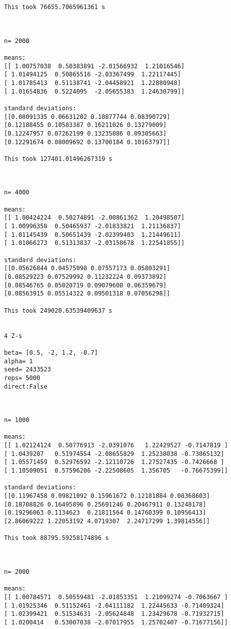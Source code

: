 \documentclass{article}
\theoremstyle{definition}
\theoremstyle{remark}
\begin{document}
\begin{verbatim}
This took 76655.7065961361 s



n= 2000

means: 
[[ 1.00757038  0.50383891 -2.01566932  1.21016546]
[ 1.01494125  0.50865516 -2.03367499  1.22117445]
[ 1.01785413  0.51138741 -2.04458921  1.22880948]
[ 1.01654836  0.5224095  -2.05655383  1.24630799]]

standard deviations: 
[[0.08091335 0.06631202 0.10877744 0.08390729]
[0.12188455 0.10583387 0.16211026 0.13279009]
[0.12247957 0.07262199 0.13235086 0.09305663]
[0.12291674 0.08009692 0.13700184 0.10163797]]

This took 127401.01496267319 s



n= 4000

means: 
[[ 1.00424224  0.50274891 -2.00861362  1.20498507]
[ 1.00996358  0.50465937 -2.01833821  1.21136837]
[ 1.01145439  0.50651439 -2.02399403  1.21449611]
[ 1.01066273  0.51313837 -2.03158678  1.22541855]]

standard deviations: 
[[0.05626844 0.04575098 0.07557173 0.05803291]
[0.08529223 0.07529992 0.11232224 0.09373892]
[0.08546765 0.05020719 0.09079608 0.06359679]
[0.08563915 0.05514322 0.09501318 0.07056298]]

This took 249020.63539409637 s


4 Z-s

beta= [0.5, -2, 1.2, -0.7]
alpha= 1
seed= 2433523
reps= 5000
direct:False



n= 1000

means: 
[[ 1.02124124  0.50776913 -2.0391076   1.22429527 -0.7147819 ]
[ 1.0439207   0.51974554 -2.08655829  1.25238038 -0.73065132]
[ 1.05571459  0.52976592 -2.12110726  1.27527435 -0.7426668 ]
[ 1.10509051  0.57596206 -2.22508605  1.356705   -0.76675399]]

standard deviations: 
[[0.11967458 0.09821092 0.15961672 0.12181884 0.08368603]
[0.18708826 0.16495896 0.25691246 0.20467911 0.13248178]
[0.19296063 0.1134623  0.21811564 0.14760399 0.10956413]
[2.86069222 1.22053192 4.0719307  2.24717299 1.39814556]]

This took 88795.59258174896 s



n= 2000

means: 
[[ 1.00784571  0.50559481 -2.01853351  1.21099274 -0.7063667 ]
[ 1.01925346  0.51152461 -2.04111182  1.22445633 -0.71409324]
[ 1.02399421  0.51534631 -2.05624848  1.23429678 -0.71932715]
[ 1.0200414   0.53007038 -2.07017955  1.25702407 -0.71677156]]


\end{verbatim}
\end{document}
